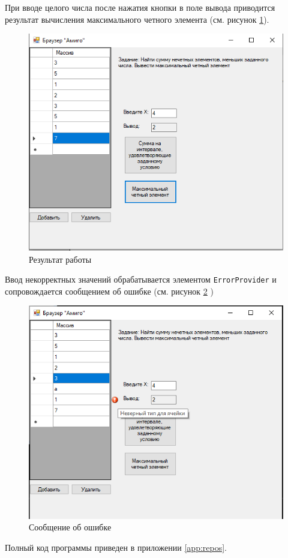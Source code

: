 При вводе целого числа после нажатия кнопки в поле вывода приводится
результат вычисления максимального четного элемента (см. рисунок \ref{fig:result42}).
\begin{figure}[H]
    \centering
    \includegraphics{task4/result2.png}
    \caption{Результат работы}
    \label{fig:result42}
\end{figure}
Ввод некорректных значений обрабатывается элементом \verb|ErrorProvider| и 
сопровождается сообщением об ошибке (см. рисунок \ref{fig:error4} )
\begin{figure}[H]
    \centering
    \includegraphics{task4/error.png}
    \caption{Сообщение об ошибке}
    \label{fig:error4}
\end{figure}
Полный код программы приведен в приложении \ref{app:repos}.